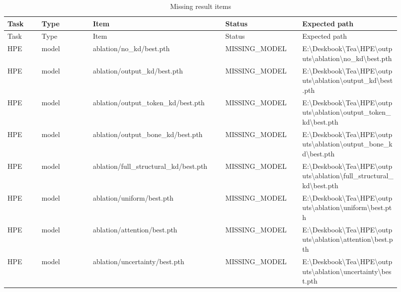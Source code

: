 \begin{longtable}{p{0.08\linewidth}p{0.12\linewidth}p{0.31\linewidth}p{0.18\linewidth}p{0.23\linewidth}}
\caption{Missing result items}\\
\toprule
Task & Type & Item & Status & Expected path\\\midrule
\endfirsthead
\toprule
Task & Type & Item & Status & Expected path\\\midrule
\endhead
HPE & model & ablation/no\_kd/best.pth & MISSING\_MODEL & \scriptsize E:\textbackslash{}Deskbook\textbackslash{}Tea\textbackslash{}HPE\textbackslash{}outputs\textbackslash{}ablation\textbackslash{}no\_kd\textbackslash{}best.pth\\
HPE & model & ablation/output\_kd/best.pth & MISSING\_MODEL & \scriptsize E:\textbackslash{}Deskbook\textbackslash{}Tea\textbackslash{}HPE\textbackslash{}outputs\textbackslash{}ablation\textbackslash{}output\_kd\textbackslash{}best.pth\\
HPE & model & ablation/output\_token\_kd/best.pth & MISSING\_MODEL & \scriptsize E:\textbackslash{}Deskbook\textbackslash{}Tea\textbackslash{}HPE\textbackslash{}outputs\textbackslash{}ablation\textbackslash{}output\_token\_kd\textbackslash{}best.pth\\
HPE & model & ablation/output\_bone\_kd/best.pth & MISSING\_MODEL & \scriptsize E:\textbackslash{}Deskbook\textbackslash{}Tea\textbackslash{}HPE\textbackslash{}outputs\textbackslash{}ablation\textbackslash{}output\_bone\_kd\textbackslash{}best.pth\\
HPE & model & ablation/full\_structural\_kd/best.pth & MISSING\_MODEL & \scriptsize E:\textbackslash{}Deskbook\textbackslash{}Tea\textbackslash{}HPE\textbackslash{}outputs\textbackslash{}ablation\textbackslash{}full\_structural\_kd\textbackslash{}best.pth\\
HPE & model & ablation/uniform/best.pth & MISSING\_MODEL & \scriptsize E:\textbackslash{}Deskbook\textbackslash{}Tea\textbackslash{}HPE\textbackslash{}outputs\textbackslash{}ablation\textbackslash{}uniform\textbackslash{}best.pth\\
HPE & model & ablation/attention/best.pth & MISSING\_MODEL & \scriptsize E:\textbackslash{}Deskbook\textbackslash{}Tea\textbackslash{}HPE\textbackslash{}outputs\textbackslash{}ablation\textbackslash{}attention\textbackslash{}best.pth\\
HPE & model & ablation/uncertainty/best.pth & MISSING\_MODEL & \scriptsize E:\textbackslash{}Deskbook\textbackslash{}Tea\textbackslash{}HPE\textbackslash{}outputs\textbackslash{}ablation\textbackslash{}uncertainty\textbackslash{}best.pth\\

\end{longtable}
